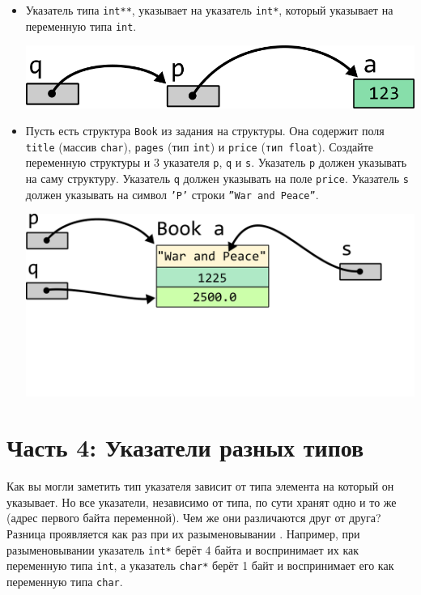 \documentclass{article}
\begin{document}
\begin{itemize}
\item Указатель типа \texttt{int**}, указывает на указатель \texttt{int*}, который указывает на переменную типа \texttt{int}.
\begin{center}
\includegraphics[scale=1]{../images/pointer_tasks/pointer_tasks_pointer_to_pointer.png}
\end{center}

\item Пусть есть структура \texttt{Book} из задания на структуры. Она содержит поля \texttt{title} (массив \texttt{char}), \texttt{pages} (тип \texttt{int}) и \texttt{price} (\texttt{тип float}). Создайте переменную структуры и 3 указателя \texttt{p}, \texttt{q} и \texttt{s}. Указатель \texttt{p} должен указывать на саму структуру. Указатель \texttt{q} должен указывать на поле \texttt{price}. Указатель \texttt{s} должен указывать на символ \texttt{'P'} строки \texttt{''War and Peace''}.
\begin{center}
\includegraphics[scale=1]{../images/pointer_tasks/pointer_task_struct.png}
\end{center}
\end{itemize}


\newpage
\section*{Часть 4: Указатели разных типов}
Как вы могли заметить тип указателя зависит от типа элемента на который он указывает. Но все указатели, независимо от типа, по сути хранят одно и то же (адрес первого байта переменной). Чем же они различаются друг от друга? Разница проявляется как раз при их разыменовывании . Например, при разыменовывании указатель \texttt{int*} берёт 4 байта и воспринимает их как переменную типа \texttt{int}, а указатель \texttt{char*} берёт 1 байт и воспринимает его как переменную типа \texttt{char}.\\
\end{document}
